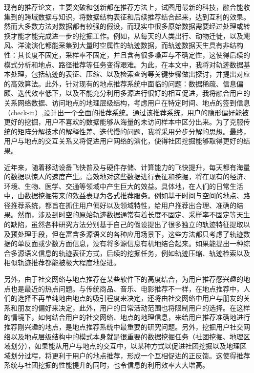 现有的推荐论文，主要突破和创新都在推荐方法上，试图用最新的科技，融合能收集到的跨域数据与知识，将数据结构表征和后续推荐结合起来，达到互利的效果。然而大多数方法对数据都有较强的假设，而现实中很多原始数据需要经过处理或转换才能才能完成进一步的挖掘工作。例如，从每天的人类出行、动物迁徙，以及飓风、洋流演化都能采集到大量时空属性的轨迹数据，而轨迹数据天生具有非结构性：其长度不固定，采样率不固定，并且含有很多噪声与不确定性，这使得后续的模式分析和地点、路径推荐等任务变得艰难。为此，在本文中，我将对轨迹数据基本处理，包括轨迹的表征、压缩、以及检索查询等关键步骤做出探讨，并提出对应的高效算法。此外，针对现有的地点推荐系统中面临的问题：数据稀疏、信息偏颇、迭代效率低下，以及不能充分利用多源进行很好的相互促进，我将融合用户的关系网络数据、访问地点的地理层级结构，考虑用户在特定时间、地点的签到信息（check-in）,设计出一个全面的推荐系统。通过该推荐系统，用户的隐形偏好能被更好的挖掘，用户不喜欢的数据能够从海量的未访问样本中区分出来。为了克服传统的矩阵分解技术的解释性差、迭代慢的问题，我将采用分步分解的思想。最终，用户与地点的交互关系又将促进用户网络的演化，使得社团挖掘能够取得更好的结果。


近年来，随着移动设备飞快普及与硬件存储、计算能力的飞快提升，每天都有海量的数据以惊人的速度产生。高效地对这些数据进行表征和挖掘，将在现有的经济、环境、生物、医学、交通等领域中产生巨大的效益。具体地，在人们的日常生活中，由数据挖掘带来的效益表现为各式推荐服务。例如基于时间与空间的地点、路径推荐系统，都旨在抓住用户偏好以及领域特性，给用户推荐出合理、准确的结果。然而，涉及到时空的原始轨迹数据通常有着长度不固定、采样率不固定等天生的缺陷，虽然各种研究方法分别基于自己的假设提出了很多独立的轨迹特征提取以及预处理手段，但在富含多源语义的各种应用场景下，这些方法都只考虑了轨迹数据的单反面或少数方面信息，没有将多源信息有机地结合起来。如果能提出一种综合多源语义信息的轨迹表征方式，后续的挖掘任务，例如轨迹压缩、轨迹检索以及相似轨迹推荐都能被极大程度地促进。

另外，由于社交网络与地点推荐在某些软件下的高度结合，为用户推荐感兴趣的地点也是最近的热点问题。与传统商品、音乐、电影推荐不一样，在地点推荐中，人们的选择不再单纯地由地点的吸引程度来决定，还将由社交网络中用户与朋友的关系和朋友的偏好来决定，此外，用户的日常活动范围也将限制用户的选择。在这样的情境下，如何结合用户的社交网络、地点的地理信息，来给用户推荐准确地进行推荐刚兴趣的地点，是地点推荐系统中最重要的研究问题。另外，挖掘用户社交网络以及地点层级结构中的模式本身就是很重要的数据挖掘任务（社团挖掘、地理区域划分），如果能从用户与地点的交互中，以某种方式以促进社团挖掘以及地理区域划分过程，将更利于用户的地点推荐，形成一个互相促进的正反馈。这使得推荐系统与社团挖掘的性能提升的同时，也令信息的利用效率大大增高。


